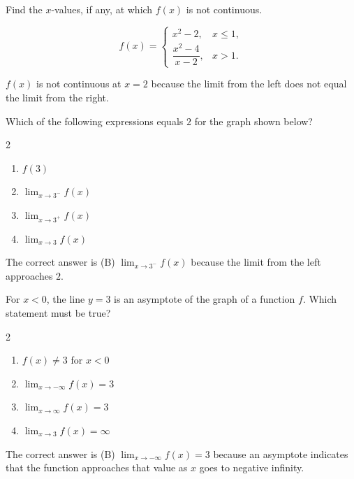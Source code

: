 \begin{questions}
\question[3] Find the $x$-values, if any, at which $f(x)$ is not continuous. 

\[
f(x)=
\begin{cases}
x^2-2, & x\leq 1,\\[2pt]
\dfrac{x^2-4}{x-2}, & x>1.
\end{cases}
\]
\begin{solution}[2cm]
  $f(x)$ is not continuous at $x=2$ because the limit from the left does not equal the limit from the right.
\end{solution}


\question[2] Which of the following expressions equals $2$ for the graph shown below?
\begin{center}
\end{center}
\begin{multicols}{2}
\begin{enumerate}[label=(\Alph*)]
\item $f(3)$
\item $\displaystyle\lim_{x\to3^-}f(x)$
\item $\displaystyle\lim_{x\to3^+}f(x)$
\item $\displaystyle\lim_{x\to3}f(x)$
\end{enumerate}
\end{multicols}
\begin{solution}[1cm]
  The correct answer is (B) $\displaystyle\lim_{x\to3^-}f(x)$ because the limit from the left approaches $2$.
\end{solution}


\question[2] For $x<0$, the line $y=3$ is an asymptote of the graph of a function $f$. Which statement must be true?
\begin{multicols}{2}
\begin{enumerate}[label=(\Alph*)]
\item $f(x)\ne3$ for $x<0$
\item $\displaystyle\lim_{x\to-\infty}f(x)=3$
\item $\displaystyle\lim_{x\to\infty}f(x)=3$
\item $\displaystyle\lim_{x\to3}f(x)=\infty$
\end{enumerate}
\end{multicols}
\begin{solution}[1cm]
  The correct answer is (B) $\displaystyle\lim_{x\to-\infty}f(x)=3$ because an asymptote indicates that the function approaches that value as $x$ goes to negative infinity.
\end{solution}


\end{questions}
